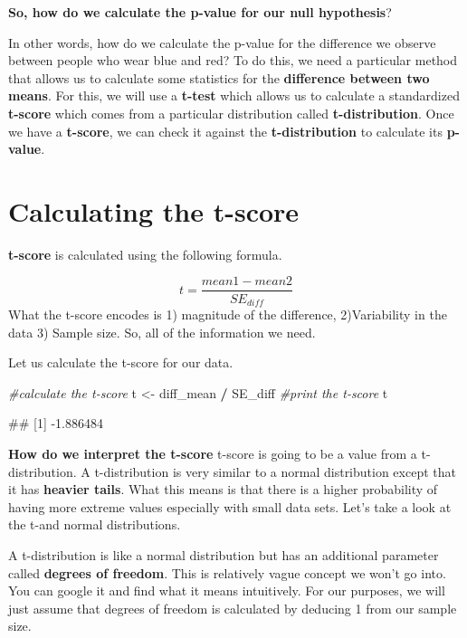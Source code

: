 \documentclass[
]{book}
\newenvironment{Shaded}{\begin{snugshade}}{\end{snugshade}}
\newcommand{\CommentTok}[1]{\textcolor[rgb]{0.56,0.35,0.01}{\textit{#1}}}
\newcommand{\NormalTok}[1]{#1}
\newcommand{\OtherTok}[1]{\textcolor[rgb]{0.56,0.35,0.01}{#1}}
\newcommand{\SpecialCharTok}[1]{\textcolor[rgb]{0.81,0.36,0.00}{\textbf{#1}}}
\begin{document}
\textbf{So, how do we calculate the p-value for our null hypothesis}?

In other words, how do we calculate the p-value for the difference we observe between people who wear blue and red? To do this, we need a particular method that allows us to calculate some statistics for the \textbf{difference between two means}. For this, we will use a \textbf{t-test} which allows us to calculate a standardized \textbf{t-score} which comes from a particular distribution called \textbf{t-distribution}. Once we have a \textbf{t-score}, we can check it against the \textbf{t-distribution} to calculate its \textbf{p-value}.

\section{Calculating the t-score}\label{calculating-the-t-score}

\textbf{t-score} is calculated using the following formula.

\[t = \frac{mean1-mean2}{SE_{diff}}\]
What the t-score encodes is 1) magnitude of the difference, 2)Variability in the data 3) Sample size. So, all of the information we need.

Let us calculate the t-score for our data.

\begin{Shaded}
\begin{Highlighting}[]
\CommentTok{\#calculate the t{-}score}
\NormalTok{t }\OtherTok{\textless{}{-}}\NormalTok{ diff\_mean }\SpecialCharTok{/}\NormalTok{ SE\_diff}
\CommentTok{\#print the t{-}score}
\NormalTok{t}
\end{Highlighting}
\end{Shaded}

\begin{Shaded}
\begin{Highlighting}[]
\NormalTok{\#\# [1] {-}1.886484}
\end{Highlighting}
\end{Shaded}

\textbf{How do we interpret the t-score}
t-score is going to be a value from a t-distribution. A t-distribution is very similar to a normal distribution except that it has \textbf{heavier tails}. What this means is that there is a higher probability of having more extreme values especially with small data sets. Let's take a look at the t-and normal distributions.

A t-distribution is like a normal distribution but has an additional parameter called \textbf{degrees of freedom}. This is relatively vague concept we won't go into. You can google it and find what it means intuitively. For our purposes, we will just assume that degrees of freedom is calculated by deducing 1 from our sample size.
\end{document}
